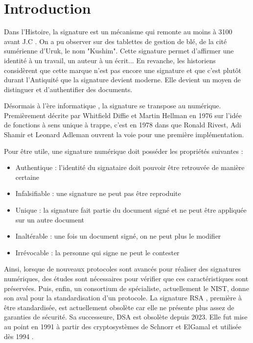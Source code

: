 \documentclass{backend}
\begin{document}


\buildmargins       %
\firstPage          %
\summary    	    %

  

\section{Introduction}

Dans l'Histoire, la signature est un mécanisme qui remonte au moins à 3100 avant J.C \cite{sumer_sign}. On a pu observer sur des tablettes de gestion de blé, de la cité sumérienne d'Uruk, le nom "Kushim". Cette signature permet d'affirmer une identité à un travail, un auteur à un écrit... En revanche, les historiens considèrent que cette marque n'est pas encore une signature et que c'est plutôt durant l'Antiquité que la signature devient moderne. Elle devient un moyen de distinguer et d'authentifier des documents.\medbreak

Désormais à l'ère informatique \cite{signature_electronique}, la signature se transpose au numérique. Premièrement décrite par Whitfield Diffie et Martin Hellman en 1976 \cite{1055638} sur l'idée de fonctions à sens unique à trappe, c'est en 1978 dans  \cite{signRSA} que Ronald Rivest, Adi Shamir et Leonard Adleman ouvrent la voie pour une première implémentation.\medbreak

Pour être utile, une signature numérique doit posséder les propriétés suivantes :
\begin{itemize}
  \item Authentique : l'identité du signataire doit pouvoir être retrouvée de manière certaine
  \item Infalsifiable : une signature ne peut pas être reproduite
  \item Unique : la signature fait partie du document signé et ne peut être appliquée sur un autre document
  \item Inaltérable : une fois un document signé, on ne peut plus le modifier
  \item Irrévocable : la personne qui signe ne peut le contester
\end{itemize}\medbreak

Ainsi, lorsque de nouveaux protocoles sont avancés pour réaliser des signatures numériques, des études sont nécessaires pour vérifier que ces caractéristiques sont préservées. Puis, enfin, un consortium de spécialiste, actuellement le NIST, donne son aval pour la standardisation d'un protocole. La signature RSA , première à être standardisée, est actuellement obsolète car elle ne présente plus assez de garanties de sécurité. Sa successeure, DSA  est obsolète depuis 2023. Elle fut mise au point en 1991 à partir des cryptosystèmes de Schnorr et ElGamal \cite{dsaFIPS} et utilisée dès 1994 \cite{dsawiki}.\medbreak
\end{document}
